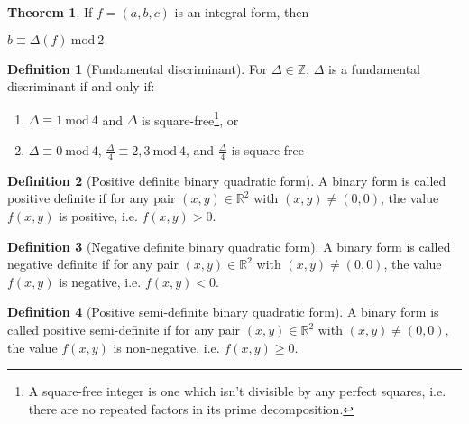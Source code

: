 \documentclass{article}
\theoremstyle{definition}
\newtheorem{definition}{Definition}[section]
\theoremstyle{theorem}
\newtheorem{theorem}{Theorem}[section]
\theoremstyle{example}
\theoremstyle{corollary}
\begin{document}
\theoremstyle{theorem}
\begin{theorem}
If \(f = (a, b, c)\) is an integral form, then
\begin{center}
\(b \equiv \Delta(f) \ \textrm{mod} \ 2\)
\end{center}
\end{theorem}

\bigskip

\theoremstyle{definition}
\begin{definition}[Fundamental discriminant]
For \(\Delta \in \mathbb{Z}\), \(\Delta\) is a fundamental discriminant if and only if:
\begin{enumerate}
\item \(\Delta \equiv 1 \ \textrm{mod} \ 4\) and \(\Delta\) is square-free\footnote{A square-free integer is one which isn't divisible by any perfect squares, i.e. there are no repeated factors in its prime decomposition.}, or
\item \(\Delta \equiv 0 \ \textrm{mod} \ 4\), \(\frac{\Delta}{4} \equiv 2, 3 \ \textrm{mod} \ 4\), and \(\frac{\Delta}{4}\) is square-free
\end{enumerate}
\end{definition}

\bigskip

\theoremstyle{definition}
\begin{definition}[Positive definite binary quadratic form]
A binary form is called positive definite if for any pair \((x, y) \in \mathbb{R}^{2}\) with \((x, y) \ne (0, 0)\), the value \(f(x, y)\) is positive, i.e. \(f(x, y) > 0\).
\end{definition}

\bigskip

\theoremstyle{definition}
\begin{definition}[Negative definite binary quadratic form]
A binary form is called negative definite if for any pair \((x, y) \in \mathbb{R}^{2}\) with \((x, y) \ne (0, 0)\), the value \(f(x, y)\) is negative, i.e. \(f(x, y) < 0\).
\end{definition}

\bigskip

\theoremstyle{definition}
\begin{definition}[Positive semi-definite binary quadratic form]
A binary form is called positive semi-definite if for any pair \((x, y) \in \mathbb{R}^{2}\) with \((x, y) \ne (0, 0)\), the value \(f(x, y)\) is non-negative, i.e. \(f(x, y) \ge 0\).
\end{definition}
\end{document}

